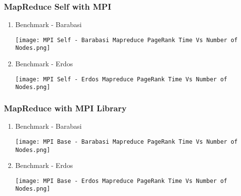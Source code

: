 \documentclass{article}
\begin{document}
    \clearpage
    
    \subsubsection{MapReduce Self with MPI}
    \begin{enumerate}
        \item Benchmark - Barabasi
        \begin{center}
            \texttt{[image: MPI Self - Barabasi Mapreduce PageRank Time Vs Number of Nodes.png]}
        \end{center}
            
        
        \item Benchmark - Erdos
        \begin{center}
            \texttt{[image: MPI Self - Erdos Mapreduce PageRank Time Vs Number of Nodes.png]}
        \end{center}
    \end{enumerate}
    
    \clearpage
    
    \subsubsection{MapReduce with MPI Library}
    
    \begin{enumerate}
        \item Benchmark - Barabasi
        \begin{center}
            \texttt{[image: MPI Base - Barabasi Mapreduce PageRank Time Vs Number of Nodes.png]}
        \end{center}
            
        
        \item Benchmark - Erdos
        \begin{center}
            \texttt{[image: MPI Base - Erdos Mapreduce PageRank Time Vs Number of Nodes.png]}
        \end{center}
    \end{enumerate}
    
    \clearpage
    
    \
    
\end{document}

